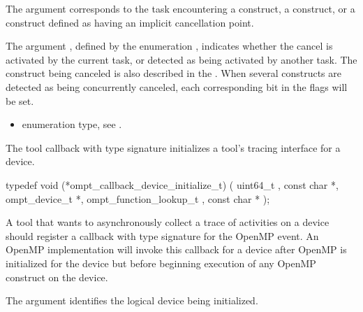 \argdesc 

The argument  corresponds to the task
encountering a  construct, a 
construct, or a construct defined as having an implicit cancellation
point.

The argument , defined by the enumeration
, indicates whether the cancel is
activated by the current task, or detected as being activated by
another task.  The construct being canceled is also described in the
. When several constructs are detected as being
concurrently canceled, each corresponding bit in the flags will be
set.

\codeptrdesc

\crossreferences
\begin{itemize}
\item {} enumeration type, see .
\end{itemize}


\label{sec:ompt_callback_device_initialize_t}

\summary The tool callback with type signature
 initializes a
tool's tracing interface for a device.

\format

\begin{ccppspecific}
\begin{omptCallback}
typedef void (*ompt_callback_device_initialize_t) (
  uint64_t ,
  const char *,
  ompt_device_t *,
  ompt_function_lookup_t ,
  const char *
);
\end{omptCallback}
\end{ccppspecific}


\descr 

A tool that wants to asynchronously collect a trace of
activities on a device should register a callback with type signature
 for the
 OpenMP event. An OpenMP
implementation will invoke this callback for a device after OpenMP is
initialized for the device but before beginning execution of any
OpenMP construct on the device.

\argdesc

The argument  identifies the logical device
being initialized.

